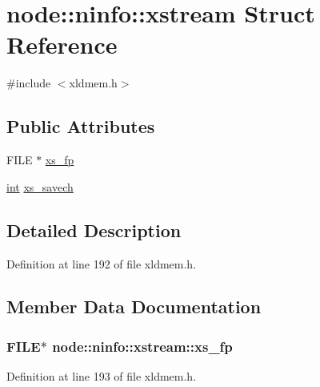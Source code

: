 \hypertarget{structnode_1_1ninfo_1_1xstream}{}\section{node\+:\+:ninfo\+:\+:xstream Struct Reference}
\label{structnode_1_1ninfo_1_1xstream}


{\ttfamily \#include $<$xldmem.\+h$>$}

\subsection*{Public Attributes}
\begin{DoxyCompactItemize}
\item 
F\+I\+LE $\ast$ \hyperlink{structnode_1_1ninfo_1_1xstream_ad8cf39ae7b473b951b7dc6b31805f6c9}{xs\+\_\+fp}
\item 
\hyperlink{xmltok_8h_a5a0d4a5641ce434f1d23533f2b2e6653}{int} \hyperlink{structnode_1_1ninfo_1_1xstream_a5b0bfb01d3bf01b90f51e6a9115ad3d9}{xs\+\_\+savech}
\end{DoxyCompactItemize}


\subsection{Detailed Description}


Definition at line 192 of file xldmem.\+h.



\subsection{Member Data Documentation}
\subsubsection[{\texorpdfstring{xs\+\_\+fp}{xs_fp}}]{\setlength{\rightskip}{0pt plus 5cm}F\+I\+LE$\ast$ node\+::ninfo\+::xstream\+::xs\+\_\+fp}\hypertarget{structnode_1_1ninfo_1_1xstream_ad8cf39ae7b473b951b7dc6b31805f6c9}{}\label{structnode_1_1ninfo_1_1xstream_ad8cf39ae7b473b951b7dc6b31805f6c9}


Definition at line 193 of file xldmem.\+h.

